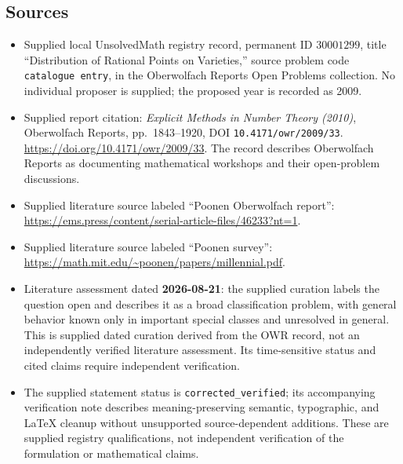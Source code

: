 \documentclass[11pt]{article}
\begin{document}
\subsection{Sources}
\begin{itemize}
\item Supplied local UnsolvedMath registry record, permanent ID \(30001299\), title ``Distribution of Rational Points on Varieties,'' source problem code \texttt{catalogue entry}, in the Oberwolfach Reports Open Problems collection. No individual proposer is supplied; the proposed year is recorded as 2009.
\item Supplied report citation: \emph{Explicit Methods in Number Theory (2010)}, Oberwolfach Reports, pp.\ 1843--1920, DOI \texttt{10.4171/owr/2009/33}. \url{https://doi.org/10.4171/owr/2009/33}. The record describes Oberwolfach Reports as documenting mathematical workshops and their open-problem discussions.
\item Supplied literature source labeled ``Poonen Oberwolfach report'': \url{https://ems.press/content/serial-article-files/46233?nt=1}.
\item Supplied literature source labeled ``Poonen survey'': \url{https://math.mit.edu/~poonen/papers/millennial.pdf}.
\item Literature assessment dated \textbf{2026-08-21}: the supplied curation labels the question open and describes it as a broad classification problem, with general behavior known only in important special classes and unresolved in general. This is supplied dated curation derived from the OWR record, not an independently verified literature assessment. Its time-sensitive status and cited claims require independent verification.
\item The supplied statement status is \texttt{corrected\_verified}; its accompanying verification note describes meaning-preserving semantic, typographic, and LaTeX cleanup without unsupported source-dependent additions. These are supplied registry qualifications, not independent verification of the formulation or mathematical claims.
\end{itemize}
\end{document}
